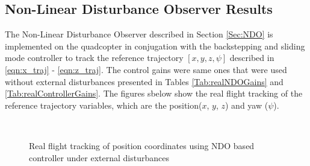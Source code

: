 \documentclass[letterpaper%
, twoside%
, 12pt%
,memoire%
, english%
,creativecommons,hyperref%
]{thETS}
\begin{document}
\subsection{Non-Linear Disturbance Observer Results}
The Non-Linear Disturbance Observer described in Section \ref{Sec:NDO} is implemented on the quadcopter in conjugation with the backstepping and sliding mode controller to track the reference trajectory $[x,y,z,\psi]$ described in \eqref{eqn:x_traj} - \eqref{eqn:z_traj}. The control gains were same ones that were used without external disturbances  presented in Tables \ref{Tab:realNDOGains} and \ref{Tab:realControllerGains}. The figures sbelow show the real flight tracking of the reference trajectory variables, which are the position($x$, $y$, $z$) and yaw ($\psi$). 
\begin{figure}[H]
	\centering
	 \\ \parbox{0.75\textwidth}{\caption{Real flight tracking of position coordinates using NDO based controller under external disturbances\label{Fig:xyztracNDODist}}}
\end{figure}
\end{document}
